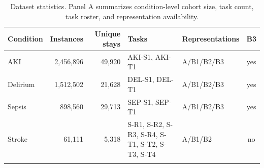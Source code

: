 \begin{table}[t]
\caption{Dataset statistics. Panel A summarizes condition-level cohort size, task count, task roster, and representation availability.}
\label{tab:dataset_condition}
\centering
\scriptsize
\begin{tabularx}{\textwidth}{@{}lrr>{\raggedright\arraybackslash}X>{\raggedright\arraybackslash}Xc@{}}
\toprule
Condition & Instances & Unique stays & Tasks & Representations & B3 \\
\midrule
AKI & 2,456,896 & 49,920 & AKI-S1, AKI-T1 & A/B1/B2/B3 & yes \\
Delirium & 1,512,502 & 21,628 & DEL-S1, DEL-T1 & A/B1/B2/B3 & yes \\
Sepsis & 898,560 & 29,713 & SEP-S1, SEP-T1 & A/B1/B2/B3 & yes \\
Stroke & 61,111 & 5,318 & S-R1, S-R2, S-R3, S-R4, S-T1, S-T2, S-T3, S-T4 & A/B1/B2 & no \\
\botrule
\end{tabularx}
\normalsize
\end{table}

